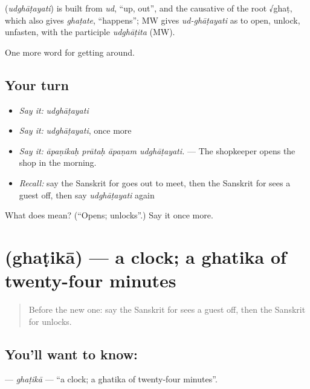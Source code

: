 \begin{cousinweb}
\textbf{} (\emph{udghāṭayati}) is built from \emph{ud}, \textquotedblleft{}up, out\textquotedblright{}, and the causative of the root √ghaṭ, which also gives \emph{ghaṭate}, \textquotedblleft{}happens\textquotedblright{}; MW gives \emph{ud-ghāṭayati} as to open, unlock, unfasten, with the participle \emph{udghāṭita} (MW).
\end{cousinweb}

\begin{grammarlens}[title={What you've built}]
One more word for getting around.
\end{grammarlens}

\subsection*{Your turn}
\begin{itemize}
\raggedright
  \item \emph{Say it:} \emph{udghāṭayati}
  \item \emph{Say it:} \emph{udghāṭayati}, once more
  \item \emph{Say it:} \emph{āpaṇikaḥ prātaḥ āpaṇam udghāṭayati.} — The shopkeeper opens the shop in the morning.
  \item \emph{Recall:} say the Sanskrit for goes out to meet, then the Sanskrit for sees a guest off, then say \emph{udghāṭayati} again
\end{itemize}

\begin{tcolorbox}[breakable,colback=teal!4,colframe=teal!35!black,title={Before you move on}]
What does  mean? (\textquotedblleft{}Opens; unlocks\textquotedblright{}.) Say it once more.
\end{tcolorbox}
\section[\texorpdfstring{\sk{घटिका} (ghaṭikā)}{घटिका (ghaṭikā)}]{ (ghaṭikā) — a clock; a ghatika of twenty-four minutes}

\label{lesson:SA-C429-ghatika}



\begin{quote}
Before the new one: say the Sanskrit for sees a guest off, then the Sanskrit for unlocks.
\end{quote}

\subsection*{You'll want to know: }
\textbf{} — \emph{ghaṭikā} — \textquotedblleft{}a clock; a ghatika of twenty-four minutes\textquotedblright{}.

